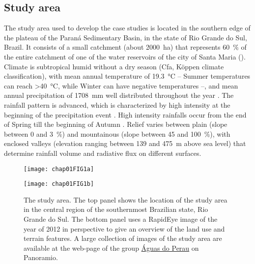 \subsection{Study area}
\label{sec:intro-study-area}

The study area used to develop the case studies is located in the southern edge of the plateau of the 
Paraná Sedimentary Basin, in the state of Rio Grande do Sul, Brazil. It consists of a small catchment
(about \SI{2000}{\hectare}) that represents \SI{60}{\percent} of the entire catchment of one of the 
water reservoirs of the city of Santa Maria (). Climate is subtropical humid 
without a dry season (Cfa, Köppen climate classification), with mean annual temperature of 
\SI{19.3}{\celsius} -- Summer temperatures can reach \SI{>40}{\celsius}, while Winter can have negative
temperatures \cite{HeldweinEtAl2009} --, and mean annual precipitation of \SI{1708}{\milli\metre} well
distributed throughout the year \cite{Maluf2000}. The rainfall pattern is advanced, which is 
characterized by high intensity at the beginning of the precipitation event \cite{MehlEtAl2001}. 
High intensity rainfalls occur from the end of Spring till the beginning of Autumn 
\cite{MouraBueno2012}. Relief varies between plain (slope between \num{0} and \SI{3}{\percent}) and
mountainous (slope between \num{45} and \SI{100}{\percent}), with enclosed valleys (elevation 
ranging between \num{139} and \SI{475}{\metre} above sea level) that determine rainfall volume and 
radiative flux on different surfaces.

\begin{figure}[!ht]
    \centering
    \begin{minipage}[b]{95mm}
      \subcaption{}
      \label{fig:brazil}
      \centering
      \texttt{[image: chap01FIG1a]}
    \end{minipage}
    \begin{minipage}[b]{95mm}
      \subcaption{}
      \label{fig:points}
      \centering
      \texttt{[image: chap01FIG1b]}
    \end{minipage}
  \caption{The study area. The top panel shows the location of the study area in the central region 
  of the southernmost Brazilian state, Rio Grande do Sul. The bottom panel uses a RapidEye image
  of the year of 2012 in perspective to give an overview of the land use and terrain features.
  A large collection of images of the study area are available at the web-page of the group
  \href{http://www.panoramio.com/group/130903}{Águas do Perau} on Panoramio.}
  \label{fig:intro-location}
\end{figure}

